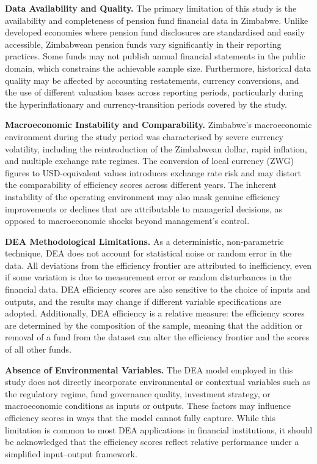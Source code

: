 \documentclass[12pt,a4paper]{article}
\begin{document}
\textbf{Data Availability and Quality.} The primary limitation of this study is the availability and completeness of pension fund financial data in Zimbabwe. Unlike developed economies where pension fund disclosures are standardised and easily accessible, Zimbabwean pension funds vary significantly in their reporting practices. Some funds may not publish annual financial statements in the public domain, which constrains the achievable sample size. Furthermore, historical data quality may be affected by accounting restatements, currency conversions, and the use of different valuation bases across reporting periods, particularly during the hyperinflationary and currency-transition periods covered by the study.

\textbf{Macroeconomic Instability and Comparability.} Zimbabwe's macroeconomic environment during the study period was characterised by severe currency volatility, including the reintroduction of the Zimbabwean dollar, rapid inflation, and multiple exchange rate regimes. The conversion of local currency (ZWG) figures to USD-equivalent values introduces exchange rate risk and may distort the comparability of efficiency scores across different years. The inherent instability of the operating environment may also mask genuine efficiency improvements or declines that are attributable to managerial decisions, as opposed to macroeconomic shocks beyond management's control.

\textbf{DEA Methodological Limitations.} As a deterministic, non-parametric technique, DEA does not account for statistical noise or random error in the data. All deviations from the efficiency frontier are attributed to inefficiency, even if some variation is due to measurement error or random disturbances in the financial data. DEA efficiency scores are also sensitive to the choice of inputs and outputs, and the results may change if different variable specifications are adopted. Additionally, DEA efficiency is a relative measure: the efficiency scores are determined by the composition of the sample, meaning that the addition or removal of a fund from the dataset can alter the efficiency frontier and the scores of all other funds.

\textbf{Absence of Environmental Variables.} The DEA model employed in this study does not directly incorporate environmental or contextual variables such as the regulatory regime, fund governance quality, investment strategy, or macroeconomic conditions as inputs or outputs. These factors may influence efficiency scores in ways that the model cannot fully capture. While this limitation is common to most DEA applications in financial institutions, it should be acknowledged that the efficiency scores reflect relative performance under a simplified input--output framework.
\end{document}
